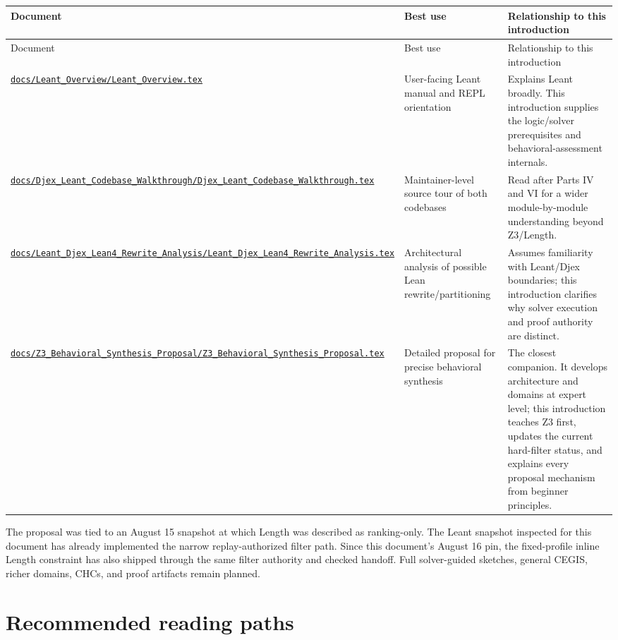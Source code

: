 \documentclass[10pt,letterpaper,oneside]{report}
\def\LeantCommit{494259dbd85ae2e6749246b08377f44b2f9936ac}
\def\LeantBase{https://github.com/VladimirReshetnikov/Leant/blob/\LeantCommit/}
\newcommand{\lpath}[1]{\href{\LeantBase#1}{\nolinkurl{#1}}}
\begin{document}
\begin{longtable}{@{}L{0.34\textwidth}L{0.25\textwidth}L{0.35\textwidth}@{}}
\toprule
Document & Best use & Relationship to this introduction \\
\midrule
\endfirsthead
\toprule
Document & Best use & Relationship to this introduction \\
\midrule
\endhead
\bottomrule
\endfoot
\lpath{docs/Leant_Overview/Leant_Overview.tex} & User-facing Leant manual and REPL orientation & Explains Leant broadly. This introduction supplies the logic/solver prerequisites and behavioral-assessment internals. \\
\lpath{docs/Djex_Leant_Codebase_Walkthrough/Djex_Leant_Codebase_Walkthrough.tex} & Maintainer-level source tour of both codebases & Read after Parts IV and VI for a wider module-by-module understanding beyond Z3/Length. \\
\lpath{docs/Leant_Djex_Lean4_Rewrite_Analysis/Leant_Djex_Lean4_Rewrite_Analysis.tex} & Architectural analysis of possible Lean rewrite/partitioning & Assumes familiarity with Leant/Djex boundaries; this introduction clarifies why solver execution and proof authority are distinct. \\
\lpath{docs/Z3_Behavioral_Synthesis_Proposal/Z3_Behavioral_Synthesis_Proposal.tex} & Detailed proposal for precise behavioral synthesis & The closest companion. It develops architecture and domains at expert level; this introduction teaches Z3 first, updates the current hard-filter status, and explains every proposal mechanism from beginner principles. \\
\end{longtable}

The proposal was tied to an August 15 snapshot at which Length was described as ranking-only. The Leant snapshot inspected for this document has already implemented the narrow replay-authorized filter path. Since this document's August 16 pin, the fixed-profile inline Length constraint has also shipped through the same filter authority and checked handoff. Full solver-guided sketches, general CEGIS, richer domains, CHCs, and proof artifacts remain planned.

\section{Recommended reading paths}
\end{document}
